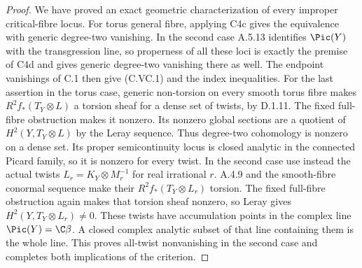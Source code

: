 \begin{proof}
We have proved an exact geometric characterization of
every improper critical-fibre locus. For torus general
fibre, applying C4c gives the equivalence with generic
degree-two vanishing. In the second case A.5.13 identifies
$\Pic(Y)$ with the transgression line, so properness of
all these loci is exactly the premise of C4d and gives
generic degree-two vanishing there as well.
The endpoint vanishings of C.1 then give (C.VC.1) and the
index inequalities.
For the last assertion in the torus case, generic non-torsion on every
smooth torus fibre makes $R^2f_*(T_Y\otimes L)$ a
torsion sheaf for a dense set of twists, by D.1.11.
The fixed full-fibre obstruction makes it nonzero.
Its nonzero global sections are a quotient of
$H^2(Y,T_Y\otimes L)$ by the Leray sequence.
Thus degree-two cohomology is nonzero on a dense set.
Its proper semicontinuity locus is closed analytic in
the connected Picard family, so it is nonzero for every
twist. In the second case use instead the actual twists
$L_r=K_Y\otimes M_r^{-1}$ for real irrational $r$.
A.4.9 and the smooth-fibre conormal sequence make their
$R^2f_*(T_Y\otimes L_r)$ torsion. The fixed full-fibre
obstruction again makes that torsion sheaf nonzero,
so Leray gives $H^2(Y,T_Y\otimes L_r)\ne0$.
These twists have accumulation points in the complex
line $\Pic(Y)=\C\beta$. A closed complex analytic subset
of that line containing them is the whole line.
This proves all-twist nonvanishing in the second case
and completes both implications of the criterion.
\end{proof}


